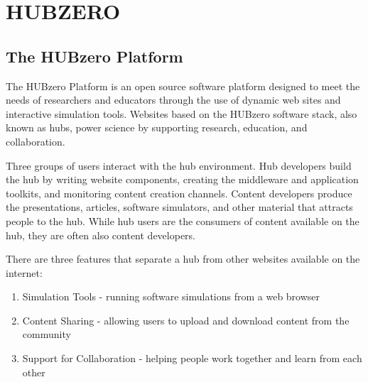 \chapter{HUBZERO}
\label{chap:hubzero}


\section{The HUBzero Platform}
\label{sec:the_hubzero_platform}



The HUBzero Platform \cite{Hubzero:2010:cise} is an open source software
platform designed to meet the needs of researchers and educators through the
use of dynamic web sites and interactive simulation tools. Websites based on
the HUBzero software stack, also known as hubs, power science by supporting
research, education, and collaboration.


Three groups of users interact with the hub environment. Hub developers build
the hub by writing website components, creating the middleware and application
toolkits, and monitoring content creation channels. Content developers produce
the presentations, articles, software simulators, and other material that
attracts people to the hub. While hub users are the consumers of content
available on the hub, they are often also content developers.

There are three features that separate a hub from other websites available on
the internet:

\begin{enumerate}
\item Simulation Tools - running software simulations from a web browser
\item Content Sharing - allowing users to upload and download content from the community
\item Support for Collaboration - helping people work together and learn from
      each other
\end{enumerate}

